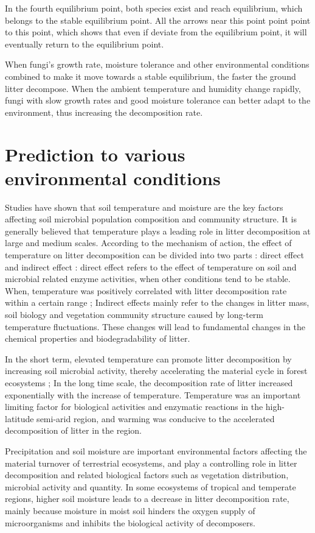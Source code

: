 \documentclass{mcmthesis}
\begin{document}
In the fourth equilibrium point, both species exist and reach equilibrium, which belongs to the stable equilibrium point. All the arrows near this point point point to this point, which shows that even if deviate from the equilibrium point, it will eventually return to the equilibrium point.

When fungi's growth rate, moisture tolerance and other environmental conditions combined to make it move towards a stable equilibrium, the faster the ground litter decompose. When the ambient temperature and humidity change rapidly, fungi with slow growth rates and good moisture tolerance can better adapt to the environment, thus increasing the decomposition rate.
\section{Prediction to various environmental conditions}
Studies have shown that soil temperature and moisture are the key factors affecting soil microbial population composition and community structure.  It is generally believed that temperature plays a leading role in litter decomposition at large and medium scales. According to the mechanism of action, the effect of temperature on litter decomposition can be divided into two parts : direct effect and indirect effect : direct effect refers to the effect of temperature on soil and microbial related enzyme activities, when other conditions tend to be stable.  When, temperature was positively correlated with litter decomposition rate within a certain range ; Indirect effects mainly refer to the changes in litter mass, soil biology and vegetation community structure caused by long-term temperature fluctuations. These changes will lead to fundamental changes in the chemical properties and biodegradability of litter.

In the short term, elevated temperature can promote litter decomposition by increasing soil microbial activity, thereby accelerating the material cycle in forest ecosystems ; In the long time scale, the decomposition rate of litter increased exponentially with the increase of temperature. Temperature was an important limiting factor for biological activities and enzymatic reactions in the high-latitude semi-arid region, and warming was conducive to the accelerated decomposition of litter in the region.    

Precipitation and soil moisture are important environmental factors affecting the material turnover of terrestrial ecosystems, and play a controlling role in litter decomposition and related biological factors such as vegetation distribution, microbial activity and quantity. In some ecosystems of tropical and temperate regions, higher soil moisture leads to a decrease in litter decomposition rate, mainly because moisture in moist soil hinders the oxygen supply of microorganisms and inhibits the biological activity of decomposers.  
\end{document}

